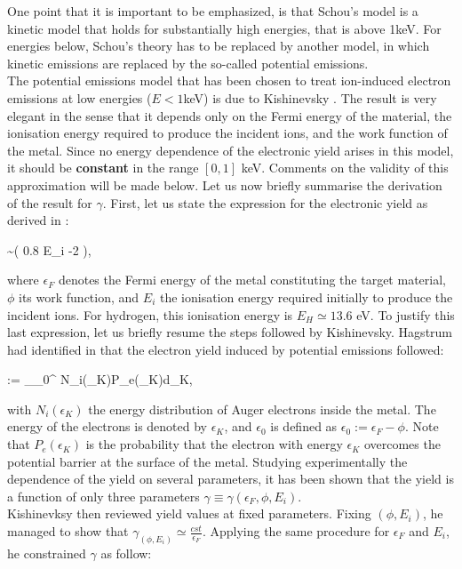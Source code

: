 \noindent One point that it is important to be emphasized, is that Schou's model is a kinetic model that holds for substantially high energies, that is above 1keV. For energies below, Schou's theory has to be replaced by another model, in which kinetic emissions are replaced by the so-called potential emissions.\\

The potential emissions model that has been chosen to treat ion-induced electron emissions at low energies ($E<1$keV) is due to Kishinevsky \cite{kishi73}. The result is very elegant in the sense that it depends only on the Fermi energy of the material, the ionisation energy required to produce the incident ions, and the work function of the metal. Since no energy dependence of the electronic yield arises in this model, it should be \textbf{constant} in the range $[0,1]$ keV. Comments on the validity of this approximation will be made below. Let us now briefly summarise the derivation of the result for $\gamma$. First, let us state the expression for the electronic yield as derived in \cite{kishi73}: 

\beq
\gamma \sim {}\big( 0.8 \cdot E_i -2 \phi \big),\label{pot_em}
\eeq

\noindent where $\epsilon_F$ denotes the Fermi energy of the metal constituting the target material, $\phi$ its work function, and $E_i$ the ionisation energy required initially to produce the incident ions. For hydrogen, this ionisation energy is $E_H \simeq 13.6$ eV. To justify this last expression, let us briefly resume the steps followed by Kishinevsky. Hagstrum had identified in \cite{Hagstrum} that the electron yield induced by potential emissions followed: 

\beq
\gamma := \int_{\epsilon_0}^{\infty} N_i(\epsilon_K)P_e(\epsilon_K)d\epsilon_K,
\eeq

\noindent with $N_i(\epsilon_K)$ the energy distribution of Auger electrons inside the metal. The energy of the electrons is denoted by $\epsilon_K$, and $\epsilon_0$ is defined as $\epsilon_0:=\epsilon_F-\phi$. Note that $P_e(\epsilon_K)$ is the probability that the electron with energy $\epsilon_K$ overcomes the potential barrier at the surface of the metal. Studying experimentally the dependence of the yield on several parameters, it has been shown that the yield is a function of only three parameters $\gamma \equiv \gamma(\epsilon_F, \phi, E_i)$.\\

\noindent Kishinevksy then reviewed yield values at fixed parameters. Fixing $(\phi, E_i)$, he managed to show that $\gamma_{(\phi,E_i)} \simeq \frac{cst}{\epsilon_F}$. Applying the same procedure for $\epsilon_F$ and $E_i$, he constrained $\gamma$ as follow: 

